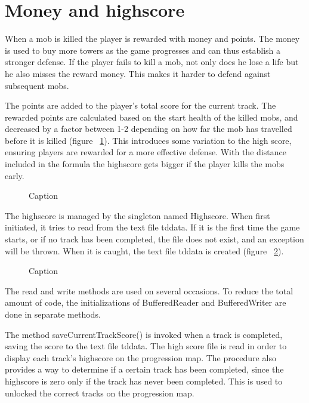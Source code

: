 \section{Money and highscore}

When a mob is killed the player is rewarded with money and points. The money is used to buy more towers as the game progresses and can thus establish a stronger defense. If the player fails to kill a mob, not only does he lose a life but he also misses the reward money. This makes it harder to defend against subsequent mobs.

The points are added to the player's total score for the current track. The rewarded points are calculated based on the start health of the killed mobs, and decreased by a factor between 1-2 depending on how far the mob has travelled before it is killed (figure ~\ref{fig:codeExChangeScore}). This introduces some variation to the high score, ensuring players are rewarded for a more effective defense. With the distance included in the formula the highscore gets bigger if the player kills the mobs early.

\begin{figure}[htb]
\begin{small}

\end{small}
\caption{Caption}
\label{fig:codeExChangeScore}
\end{figure}

The highscore is managed by the singleton named Highscore. When first initiated, it tries to read from the text file tddata. If it is the first time the game starts, or if no track has been completed, the file does not exist, and an exception will be thrown. When it is caught, the text file tddata is created (figure ~\ref{fig:codeExReadCreateFile}).

\begin{figure}[htb]
\begin{small}

\end{small}
\caption{Caption}
\label{fig:codeExReadCreateFile}
\end{figure}

The read and write methods are used on several occasions. To reduce the total amount of code, the initializations of BufferedReader and BufferedWriter are done in separate methods.

The method saveCurrentTrackScore() is invoked when a track is completed, saving the score to the text file tddata. The high score file is read in order to display each track's highscore on the progression map. The procedure also provides a way to determine if a certain track has been completed, since the highscore is zero only if the track has never been completed. This is used to unlocked the correct tracks on the progression map.